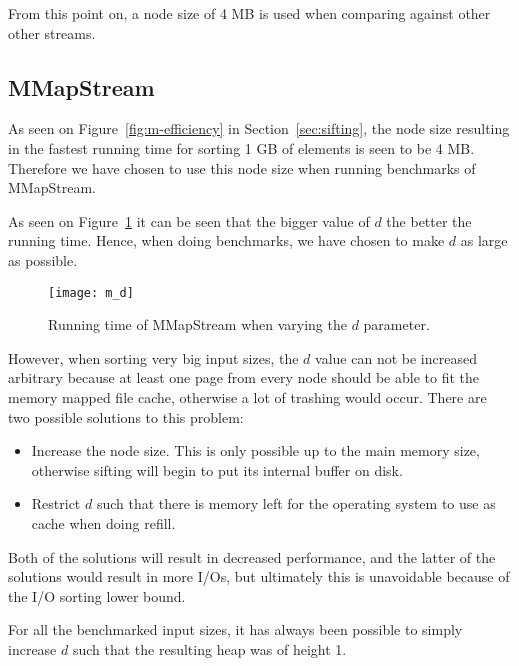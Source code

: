 
From this point on, a node size of 4 MB is used when comparing against other other streams.

\subsection{MMapStream}
As seen on Figure~\ref{fig:m-efficiency} in Section~\ref{sec:sifting}, the node size resulting in the fastest running time for sorting 1 GB of elements is seen to be 4 MB. Therefore we have chosen to use this node size when running benchmarks of MMapStream.

As seen on Figure~\ref{fig:m:vary-d} it can be seen that the bigger value of $d$ the better the running time. Hence, when doing benchmarks, we have chosen to make $d$ as large as possible. 

\begin{figure}[h!]
  \centering
  \texttt{[image: m\_d]}
  \caption{Running time of MMapStream when varying the $d$ parameter.}
  \label{fig:m:vary-d}
\end{figure}

However, when sorting very big input sizes, the $d$ value can not be increased arbitrary because at least one page from every node should be able to fit the memory mapped file cache, otherwise a lot of trashing would occur. There are two possible solutions to this problem:
\begin{itemize}
\item Increase the node size. This is only possible up to the main memory size, otherwise sifting will begin to put its internal buffer on disk.
\item Restrict $d$ such that there is memory left for the operating system to use as cache when doing refill.
\end{itemize}
Both of the solutions will result in decreased performance, and the latter of the solutions would result in more I/Os, but ultimately this is unavoidable because of the I/O sorting lower bound.

For all the benchmarked input sizes, it has always been possible to simply increase $d$ such that the resulting heap was of height 1.



